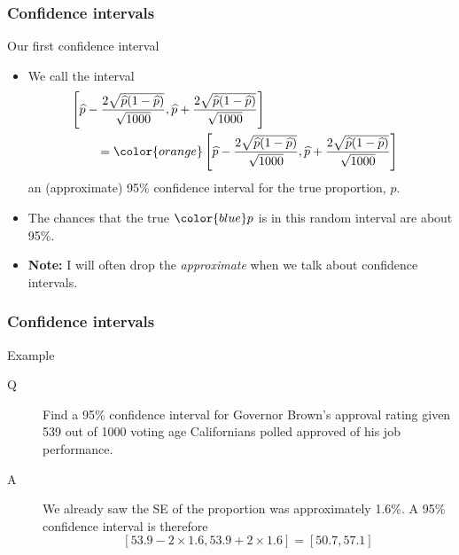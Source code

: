 \documentclass[handout]{beamer}
\begin{document}

   \begin{frame} \frametitle{Confidence intervals}

   \begin{block}
   {Our first confidence interval}
   \begin{itemize}
   \item We call the interval
   $$
   \begin{aligned}
   \lefteqn{\left[\widehat{p} - \frac{2\sqrt{\widehat{p}(1-\widehat{p})}}{\sqrt{1000}},
    \widehat{p} + \frac{2\sqrt{\widehat{p}(1-\widehat{p})}}{\sqrt{1000}}\right]} \\
    & \qquad = {\color{orange} \left[\widehat{p} - \frac{2\sqrt{\widehat{p}(1-\widehat{p})}}{\sqrt{1000}},
    \widehat{p} + \frac{2\sqrt{\widehat{p}(1-\widehat{p})}}{\sqrt{1000}}\right]}
    \end{aligned}
    $$
    an (approximate) 95\% confidence interval for the {\color{blue} true
    proportion, $p$}.

   \item The chances that the true ${\color{blue} p}$ is in this
   {\color{orange} random interval} are about 95\%.

   \item {\bf Note:} I will often drop  the {\em approximate} when we talk
   about confidence intervals.
   \end{itemize}
   \end{block}
   \end{frame}


   \begin{frame} \frametitle{Confidence intervals}

   \begin{block}
   {Example}
   \begin{description}
   \item[Q] Find a 95\% confidence interval for Governor Brown's
   approval rating given 539 out of 1000 voting age Californians
   polled approved of his job performance.
   \item[A] We already saw the SE of the proportion was approximately
   1.6\%. A 95\% confidence interval is therefore
   $$
   [53.9-2 \times 1.6, 53.9+2\times 1.6] = [50.7,57.1]
   $$
   \end{description}
   \end{block}
   \end{frame}
\end{document}
